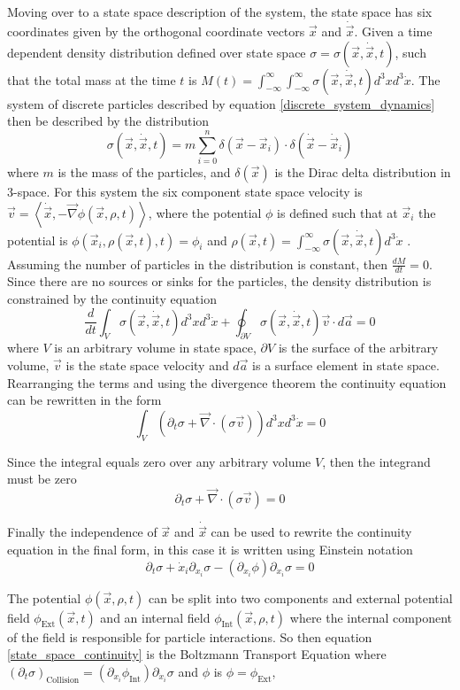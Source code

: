 \documentclass[%
 twocolumn,
 amsmath,amssymb,
 aps,
]{revtex4-1}
\newcommand{\dvec}[1]{\dot{\vec{#1}}}
\newcommand{\grad}{\vec{\nabla}}
\newcommand{\intVdot}[1]{\int_{-\infty}^{\infty} #1 d^3\dot{x}}
\newcommand{\intVVdot}[1]{\int_{-\infty}^{\infty}\int_{-\infty}^{\infty} #1 d^3xd^3\dot{x}}
\begin{document}
Moving over to a state space description of the system, the state space has six coordinates given by the orthogonal coordinate vectors $\vec{x}$ and $\dvec{x}$. Given a time dependent density distribution defined over state space $\sigma=\sigma(\vec{x}, \dvec{x}, t)$, such that the total mass at the time $t$ is $M(t)=\intVVdot{\sigma(\vec{x}, \dvec{x}, t)}$. The system of discrete particles described by equation \eqref{discrete_system_dynamics} then be described by the distribution
\[
\sigma(\vec{x}, \dvec{x}, t) = m\sum^n_{i=0}\delta(\vec{x} - \vec{x}_i)\cdot\delta(\dvec{x} - \dvec{x}_i)
\]
where $m$ is the mass of the particles, and $\delta(\vec{x})$ is the Dirac delta distribution in 3-space. For this system the six component state space velocity is $\vec{v}=\left\langle\dvec{x}, -\grad\phi(\vec{x}, \rho, t)\right\rangle$, where the potential $\phi$ is defined such that at $\vec{x}_i$ the potential is $\phi(\vec{x}_i, \rho(\vec{x}, t), t)=\phi_i$ and $\rho(\vec{x}, t)=\intVdot{\sigma(\vec{x}, \dvec{x}, t)}$ . Assuming the number of particles in the distribution is constant, then $\frac{dM}{dt}=0$. Since there are no sources or sinks for the particles, the density distribution is constrained by the continuity equation
\[
\frac{d}{dt}\int_{V}\sigma(\vec{x}, \dvec{x}, t)d^3xd^3\dot{x}+\oint_{\partial V}\sigma(\vec{x}, \dvec{x}, t)\vec{v}\cdot d\vec{a}=0
\]
where $V$ is an arbitrary volume in state space, $\partial V$ is the surface of the arbitrary volume, $\vec{v}$ is the state space velocity and $d\vec{a}$ is a surface element in state space. Rearranging the terms and using the divergence theorem the continuity equation can be rewritten in the form
\[
\int_V\left(\partial_t\sigma + \grad\cdot\left(\sigma\vec{v}\right)\right)d^3xd^3\dot{x}=0
\]

Since the integral equals zero over any arbitrary volume $V$, then the integrand must be zero
\[
\partial_t \sigma + \grad\cdot\left(\sigma\vec{v}\right)=0
\]

Finally the independence of $\vec{x}$ and $\dvec{x}$ can be used to rewrite the continuity equation in the final form, in this case it is written using Einstein notation
\begin{equation}
\partial_t \sigma + \dot{x}_i\partial_{x_i}\sigma-\left(\partial_{x_i}\phi\right)\partial_{\dot{x}_i}\sigma=0
\label{state_space_continuity}
\end{equation}

The potential $\phi(\vec{x}, \rho, t)$ can be split into two components and external potential field $\phi_{\text{Ext}}(\vec{x}, t)$ and an internal field $\phi_{\text{Int}}(\vec{x}, \rho, t)$ where the internal component of the field is responsible for particle interactions. So then equation \eqref{state_space_continuity} is the Boltzmann Transport Equation where $\left(\partial_t \sigma\right)_{\text{Collision}} = \left(\partial_{x_i}\phi_{\text{Int}}\right)\partial_{\dot{x}_i}\sigma$ and $\phi$ is $\phi = \phi_{\text{Ext}}$,
\end{document}
